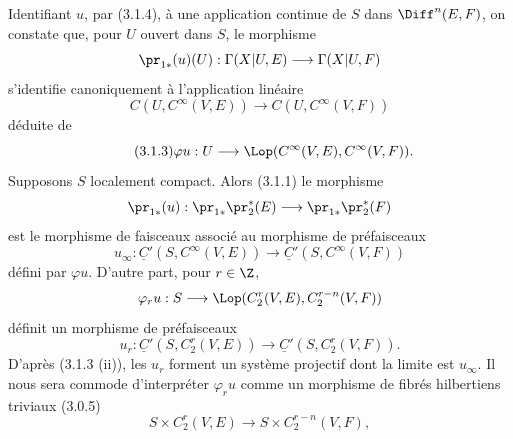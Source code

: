 Identifiant $u$, par (3.1.4), à une application continue de $S$ dans $\Diff^n(E,F)$, on constate que, pour $U$ ouvert dans $S$, le morphisme
\[
  \pr_{1*}(u)(U):\Gamma(X|U,E)\longrightarrow \Gamma(X|U,F)
\]
s'identifie canoniquement à l'application linéaire
\[
  C(U,C^\infty(V,E))\longrightarrow C(U,C^\infty(V,F))
\]
déduite de
\begin{equation}\tag{3.1.3}
  \varphi u:U\longrightarrow \Lop(C^\infty(V,E),C^\infty(V,F)).
\end{equation}
Supposons $S$ localement compact. Alors (3.1.1) le morphisme
\[
  \pr_{1*}(u):\pr_{1*}\pr_2^*(E)
  \longrightarrow \pr_{1*}\pr_2^*(F)
\]
est le morphisme de faisceaux associé au morphisme de préfaisceaux
\[
  u_\infty:\underline C'(S,C^\infty(V,E))
  \longrightarrow \underline C'(S,C^\infty(V,F))
\]
défini par $\varphi u$. D'autre part, pour $r\in\Z$,
\[
  \varphi_r u:S\longrightarrow \Lop(C^r_2(V,E),C^{r-n}_2(V,F))
\]
définit un morphisme de préfaisceaux
\[
  u_r:\underline C'(S,C^r_2(V,E))
  \longrightarrow \underline C'(S,C^r_2(V,F)).
\]
D'après (3.1.3 (ii)), les $u_r$ forment un système projectif dont la limite est $u_\infty$. Il nous sera commode d'interpréter $\varphi_r u$ comme un morphisme de fibrés hilbertiens triviaux (3.0.5)
\[
  S\times C^r_2(V,E)\longrightarrow S\times C^{r-n}_2(V,F),
\]
